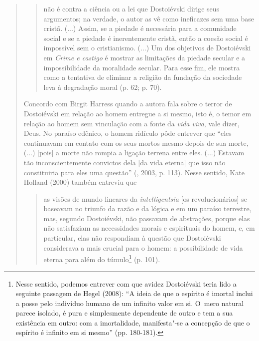 {\begin{quote}
\begin{quote}
não é contra a ciência ou a lei que Dostoiévski dirige seus argumentos;
na verdade, o autor as vê como ineficazes sem uma base cristã. (...)
Assim, se a piedade é necessária para a comunidade social e se a piedade
é inerentemente cristã, então a coesão social é impossível sem o
cristianismo. (...) Um dos objetivos de Dostoiévski em \emph{Crime e
castigo} é mostrar as limitações da piedade secular e a impossibilidade
da moralidade secular. Para esse fim, ele mostra como a tentativa de
eliminar a religião da fundação da sociedade leva à degradação moral (p.
62; p. 70).
\end{quote}

Concordo com Birgit Harress quando a autora fala sobre o terror de
Dostoiévski em relação ao homem entregue a si mesmo, isto é, o temor em
relação ao homem sem vinculação com a fonte da \emph{vida viva}, vale
dizer, Deus. No paraíso edênico, o homem ridículo pôde entrever que
``eles continuavam em contato com os seus mortos mesmo depois de sua
morte, (...) {[}pois{]} a morte não rompia a ligação terrena entre eles.
(...) Estavam tão inconscientemente convictos dela {[}da vida eterna{]}
que isso não constituiria para eles uma questão'' (, 2003, p.
113). Nesse sentido, Kate Holland (2000) também entreviu que

\begin{quote}
as visões de mundo lineares da \emph{intelligentsia} {[}os
revolucionários{]} se baseavam no triunfo da razão e da lógica e em um
paraíso terrestre, mas, segundo Dostoiévski, não passavam de abstrações,
porque elas não satisfaziam as necessidades morais e espirituais do
homem, e, em particular, elas não respondiam à questão que Dostoiévski
considerava a mais crucial para o homem: a possibilidade de vida eterna
para além do túmulo\footnote{Nesse sentido, podemos entrever com que
  avidez Dostoiévski teria lido a seguinte passagem de Hegel (2008): ``A
  ideia de que o espírito é imortal inclui a posse pelo indivíduo humano
  de um infinito valor em si. O~mero natural parece isolado, é pura e
  simplesmente dependente de outro e tem a sua existência em outro: com
  a imortalidade, manifesta"-se a concepção de que o espírito é infinito
  em si mesmo'' (pp. 180-181).} (p. 101).
\end{quote}


\end{quote}}
